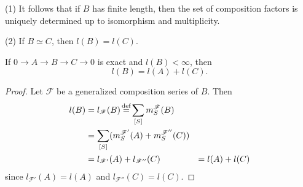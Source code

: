 \begin{note}
(1) It follows that if $B$ has finite length, then the set of
composition factors is uniquely determined up to isomorphism and
multiplicity.

(2) If $B\simeq C$, then $l(B) = l(C)$. 
\end{note}

\begin{prop}\label{prop:10}
If $0\to A\to B\to C\to 0$ is exact and $l(B) < \infty$, then 
\[l(B) = l(A) + l(C).\]
\end{prop}
\begin{proof}
Let $\mathscr{F}$ be a generalized composition series of $B$. Then
\begin{align}
l(B) & = l_{\mathscr{F}}(B) \defeq \sum_{[S]}
  m^{\mathscr{F}}_S(B)\notag\\
& = \sum_{[S]} (m^{\mathscr{F}'}_S(A) +
  m^{\mathscr{F}''}_S(C))\notag\\
& = l_{\mathscr{F}'}(A) + l_{\mathscr{F}''}(C)\notag
& = l(A) + l(C)\notag
\end{align}
since $l_{\mathscr{F}'}(A) = l(A)$ and $l_{\mathscr{F}''}(C) = l(C)$. 
\end{proof}

